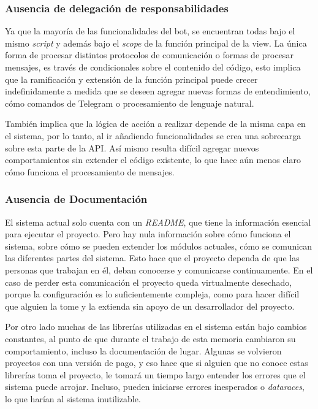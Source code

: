         \subsubsection{Ausencia de delegación de responsabilidades}
            \par Ya que la mayoría de las funcionalidades del bot, se encuentran todas bajo el mismo \textit{script} y además bajo el \textit{scope} de la función principal de la view. La única forma de procesar distintos protocolos de comunicación o formas de procesar mensajes, es través de condicionales sobre el contenido del código, esto implica que la ramificación y extensión de la función principal puede crecer indefinidamente a medida que se deseen agregar nuevas formas de entendimiento, cómo comandos de \gls{Telegram} o procesamiento de lenguaje natural.
            
            \par También implica que la lógica de acción a realizar depende de la misma capa en el sistema, por lo tanto, al ir añadiendo funcionalidades se crea una sobrecarga sobre esta parte de la API. Así mismo resulta difícil agregar nuevos comportamientos sin extender el código existente, lo que hace aún menos claro cómo funciona el procesamiento de mensajes.
        \subsubsection{Ausencia de Documentación}
            \par El sistema actual solo cuenta con un \textit{README}, que tiene la información esencial para ejecutar el proyecto. Pero hay nula información sobre cómo funciona el sistema, sobre cómo se pueden extender los módulos actuales, cómo se comunican las diferentes partes del sistema. Esto hace que el proyecto dependa de que las personas que trabajan en él, deban conocerse y comunicarse continuamente. En el caso de perder esta comunicación el proyecto queda virtualmente desechado, porque la configuración es lo suficientemente compleja, como para hacer difícil que alguien la tome y la extienda sin apoyo de un desarrollador del proyecto. 
            
            \par Por otro lado muchas de las librerías utilizadas en el sistema están bajo cambios constantes, al punto de que durante el trabajo de esta memoria cambiaron su comportamiento, incluso la documentación de lugar. Algunas se volvieron proyectos con una versión de pago, y eso hace que si alguien que no conoce estas librerías toma el proyecto, le tomará un tiempo largo entender los errores que el sistema puede arrojar. Incluso, pueden iniciarse errores inesperados o \textit{dataraces}, lo que harían al sistema inutilizable. 
            
